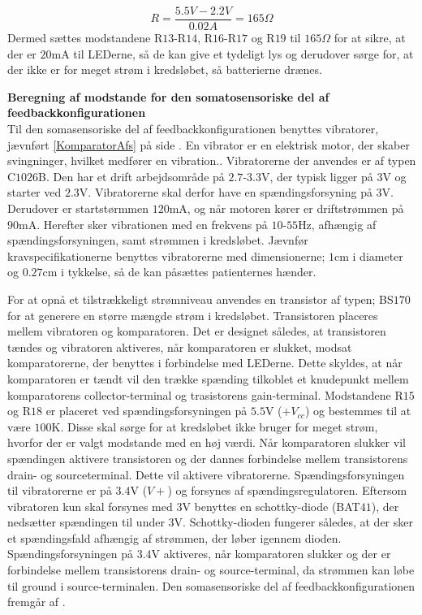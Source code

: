 \begin{equation}
R = \dfrac{5.5V - 2.2V}{0.02A} = 165\Omega
\end{equation}
\noindent Dermed sættes modstandene R$13$-R$14$, R$16$-R$17$ og R$19$ til $165\Omega$ for at sikre, at der er $20$mA til LEDerne, så de kan give et tydeligt lys og derudover sørge for, at der ikke er for meget strøm i kredsløbet, så batterierne drænes. 



\noindent\textbf{Beregning af modstande for den somatosensoriske del af feedbackkonfigurationen} \\
Til den somasensoriske del af feedbackkonfigurationen benyttes vibratorer, jævnført \ref{KomparatorAfs} på side \pageref{KomparatorAfs}. En vibrator er en elektrisk motor, der skaber svingninger, hvilket medfører en vibration.\cite{Redaktionen2009}. Vibratorerne der anvendes er af typen C$1026$B. Den har et drift arbejdsområde på $2.7$-$3.3$V, der typisk ligger på $3$V og starter ved $2.3$V. Vibratorerne skal derfor have en spændingsforsyning på $3$V. Derudover er startstørmmen $120$mA, og når motoren kører er driftstrømmen på $90$mA. Herefter sker vibrationen med en frekvens på $10$-$55$Hz, afhængig af spændingsforsyningen, samt strømmen i kredsløbet.\cite{Machinery2009} Jævnfør kravspecifikationerne benyttes vibratorerne med dimensionerne; $1$cm i diameter og $0.27$cm i tykkelse, så de kan påsættes patienternes hænder. 

For at opnå et tilstrækkeligt strømniveau anvendes en transistor af typen; BS$170$ for at generere en større mængde strøm i kredsløbet. Transistoren placeres mellem vibratoren og komparatoren. Det er designet således, at transistoren tændes og vibratoren aktiveres, når komparatoren er slukket, modsat komparatorerne, der benyttes i forbindelse med LEDerne. Dette skyldes, at når komparatoren er tændt vil den trække spænding tilkoblet et knudepunkt mellem komparatorens collector-terminal og trasistorens gain-terminal. Modstandene R$15$ og R$18$ er placeret ved spændingsforsyningen på $5.5$V ($+V_{cc}$) og bestemmes til at være $100$K\Omega. Disse skal sørge for at kredsløbet ikke bruger for meget strøm, hvorfor der er valgt modstande med en høj værdi. Når komparatoren slukker vil spændingen aktivere transistoren og der dannes forbindelse mellem transistorens drain- og sourceterminal. Dette vil aktivere vibratorerne. Spændingsforsyningen til vibratorerne er på $3.4$V ($V+$) og forsynes af spændingsregulatoren. Eftersom vibratoren kun skal forsynes med $3$V benyttes en schottky-diode (BAT$41$), der nedsætter spændingen til under $3$V. Schottky-dioden fungerer således, at der sker et spændingsfald afhængig af strømmen, der løber igennem dioden. Spændingsforsyningen på $3.4$V aktiveres, når komparatoren slukker og der er forbindelse mellem transistorens drain- og source-terminal, da strømmen kan løbe til ground i source-terminalen. Den somasensoriske del af feedbackkonfigurationen fremgår af .
 
